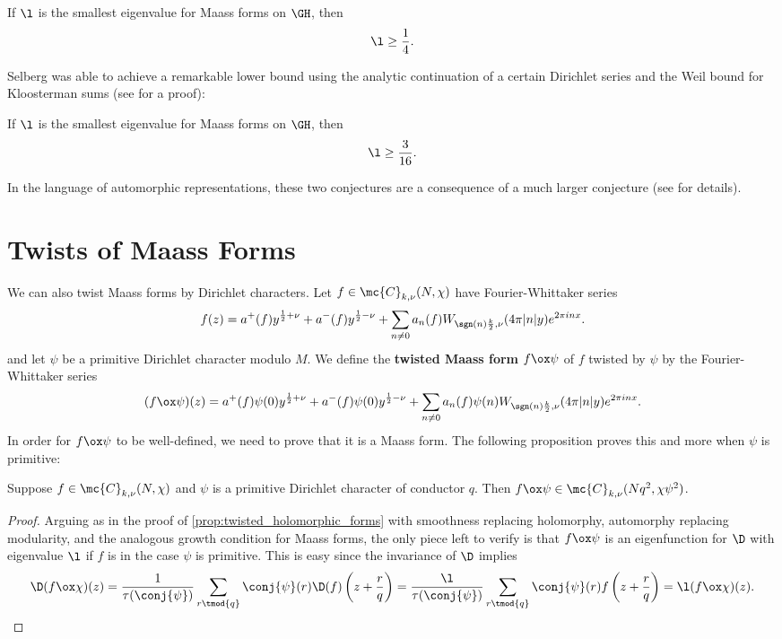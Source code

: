     \begin{conjecture}
      If $\l$ is the smallest eigenvalue for Maass forms on $\GH$, then
      \[
        \l \ge \frac{1}{4}.
      \]
    \end{conjecture}

    Selberg was able to achieve a remarkable lower bound using the analytic continuation of a certain Dirichlet series and the Weil bound for Kloosterman sums (see \cite{iwaniec2002spectral} for a proof):

    \begin{theorem}
      If $\l$ is the smallest eigenvalue for Maass forms on $\GH$, then
      \[
        \l \ge \frac{3}{16}.
      \]
    \end{theorem}

    In the language of automorphic representations, these two conjectures are a consequence of a much larger conjecture (see \cite{blomer2013role} for details).
  \section{Twists of Maass Forms}
    We can also twist Maass forms by Dirichlet characters. Let $f \in \mc{C}_{k,\nu}(N,\chi)$ have Fourier-Whittaker series
    \[
      f(z) = a^{+}(f)y^{\frac{1}{2}+\nu}+a^{-}(f)y^{\frac{1}{2}-\nu}+\sum_{n \neq 0}a_{n}(f)W_{\sgn(n)\frac{k}{2},\nu}(4\pi|n|y)e^{2\pi inx}.
    \]
    and let $\psi$ be a primitive Dirichlet character modulo $M$. We define the \textbf{twisted Maass form} $f \ox \psi$ of $f$ twisted by $\psi$ by the Fourier-Whittaker series
    \[
      (f \ox \psi)(z) = a^{+}(f)\psi(0)y^{\frac{1}{2}+\nu}+a^{-}(f)\psi(0)y^{\frac{1}{2}-\nu}+\sum_{n \neq 0}a_{n}(f)\psi(n)W_{\sgn(n)\frac{k}{2},\nu}(4\pi|n|y)e^{2\pi inx}.
    \]
    In order for $f \ox \psi$ to be well-defined, we need to prove that it is a Maass form. The following proposition proves this and more when $\psi$ is primitive:

    \begin{proposition}\label{prop:twisted_Maass_forms_primitive}
      Suppose $f \in \mc{C}_{k,\nu}(N,\chi)$ and $\psi$ is a primitive Dirichlet character of conductor $q$. Then $f \ox \psi \in \mc{C}_{k,\nu}(Nq^{2},\chi\psi^{2})$.
    \end{proposition}
    \begin{proof}
      Arguing as in the proof of \cref{prop:twisted_holomorphic_forms} with smoothness replacing holomorphy, automorphy replacing modularity, and the analogous growth condition for Maass forms, the only piece left to verify is that $f \ox \psi$ is an eigenfunction for $\D$ with eigenvalue $\l$ if $f$ is in the case $\psi$ is primitive. This is easy since the invariance of $\D$ implies
      \[
        \D(f \ox \chi)(z) = \frac{1}{\tau(\conj{\psi})}\sum_{r \tmod{q}}\conj{\psi}(r)\D(f)\left(z+\frac{r}{q}\right) =  \frac{\l}{\tau(\conj{\psi})}\sum_{r \tmod{q}}\conj{\psi}(r)f\left(z+\frac{r}{q}\right) = \l(f \ox \chi)(z).
      \]
    \end{proof}

